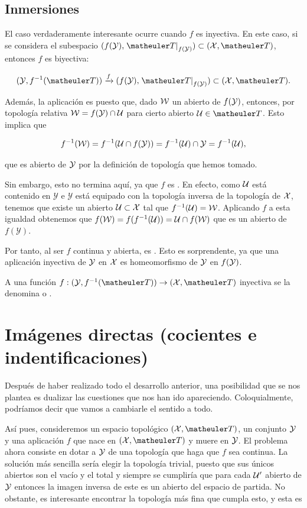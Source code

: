 \subsection{Inmersiones}
El caso verdaderamente interesante ocurre cuando $f$ es inyectiva. En este caso, si se considera el subespacio $(f(\mathcal{\Y}),\left.\T\right|_{f(\mathcal{\Y})}) \subset (\mathcal{\X},\T)$, entonces $f$ es biyectiva:

\[(\mathcal{\Y},f^{-1}(\T)) \xrightarrow{f} (f(\mathcal{\Y}),\left.\T\right|_{f(\mathcal{\Y})}) \subset (\mathcal{\X},\T).\]

Además, la aplicación es  puesto que, dado $\mathcal{W}$ un abierto de $f(\mathcal{\mathcal{Y}})$, entonces, por topología relativa $\mathcal{W}=f(\mathcal{Y})\cap \mathcal{U}$ para cierto abierto $\U\in \T$. Esto implica que

\[f^{-1}(\mathcal{W})=f^{-1}(\mathcal{U}\cap f(\mathcal{\mathcal{Y}}))=f^{-1}(\mathcal{U})\cap \mathcal{\mathcal{Y}}=f^{-1}(\mathcal{U}),\]

que es abierto de $\mathcal{\mathcal{Y}}$ por la definición de topología que hemos tomado.

Sin embargo, esto no termina aquí, ya que $f$ es . En efecto, como $\mathcal{U}$ está contenido en $\mathcal{Y}$ e $\mathcal{Y}$ está equipado con la topología inversa de la topología de $\mathcal{X}$, tenemos que existe un abierto $\mathcal{U} \subset \mathcal{X}$ tal que $f^{-1}(\mathcal{U}) = \mathcal{W}$. Aplicando $f$ a esta igualdad obtenemos que $f(\mathcal{W}) = f(f^{-1}(\mathcal{U})) = \mathcal{U} \cap f(\mathcal{W})$ que es un abierto de $f(\mathcal{Y})$.

Por tanto, al ser $f$ continua y abierta, es . Esto es sorprendente, ya que una aplicación inyectiva de $\mathcal{\mathcal{Y}}$ en $\mathcal{\mathcal{X}}$ es homeomorfismo de $\mathcal{\mathcal{Y}}$ en $f(\mathcal{\mathcal{Y}})$.

\begin{defi}
	A una función $f:(\Y,f^{-1}(\T))\to(\X,\T)$ inyectiva se la denomina  o .
\end{defi}
\section{Imágenes directas (cocientes e indentificaciones)}

Después de haber realizado todo el desarrollo anterior, una posibilidad que se nos plantea es dualizar las cuestiones que nos han ido apareciendo. Coloquialmente, podríamos decir que vamos a cambiarle el sentido a todo.

Así pues, consideremos un espacio topológico $(\mathcal{\X},\T)$, un conjunto $\mathcal{\mathcal{Y}}$ y una aplicación $f$ que nace en $(\mathcal{\X},\T)$ y muere en $\mathcal{\mathcal{Y}}$. El problema ahora consiste en dotar a $\mathcal{\mathcal{Y}}$ de una topología que haga que $f$ sea continua. La solución más sencilla sería elegir la topología trivial, puesto que sus únicos abiertos son el vacío y el total y siempre se cumpliría que para cada $\mathcal{U}'$ abierto de $\mathcal{\mathcal{Y}}$ entonces la imagen inversa de este es un abierto del espacio de partida. No obstante, es interesante encontrar la topología más fina que cumpla esto, y esta es 


